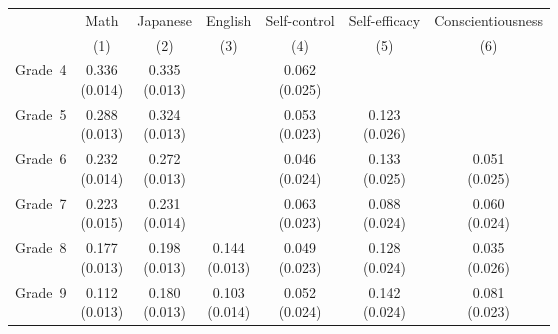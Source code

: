 \begin{tabular}{lcccccc}
\hline \hline
 & Math & Japanese & English & Self-control & Self-efficacy & Conscientiousness \\
 & (1) & (2) & (3) & (4) & (5) & (6) \\
\hline
Grade~4 & \shortstack{0.336\\(0.014)} & \shortstack{0.335\\(0.013)} &  & \shortstack{0.062\\(0.025)} &  &  \\
Grade~5 & \shortstack{0.288\\(0.013)} & \shortstack{0.324\\(0.013)} &  & \shortstack{0.053\\(0.023)} & \shortstack{0.123\\(0.026)} &  \\
Grade~6 & \shortstack{0.232\\(0.014)} & \shortstack{0.272\\(0.013)} &  & \shortstack{0.046\\(0.024)} & \shortstack{0.133\\(0.025)} & \shortstack{0.051\\(0.025)} \\
Grade~7 & \shortstack{0.223\\(0.015)} & \shortstack{0.231\\(0.014)} &  & \shortstack{0.063\\(0.023)} & \shortstack{0.088\\(0.024)} & \shortstack{0.060\\(0.024)} \\
Grade~8 & \shortstack{0.177\\(0.013)} & \shortstack{0.198\\(0.013)} & \shortstack{0.144\\(0.013)} & \shortstack{0.049\\(0.023)} & \shortstack{0.128\\(0.024)} & \shortstack{0.035\\(0.026)} \\
Grade~9 & \shortstack{0.112\\(0.013)} & \shortstack{0.180\\(0.013)} & \shortstack{0.103\\(0.014)} & \shortstack{0.052\\(0.024)} & \shortstack{0.142\\(0.024)} & \shortstack{0.081\\(0.023)} \\
\hline \hline
\end{tabular}